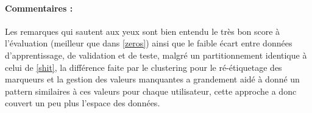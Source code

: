 \begin{table}[H]
	\centering
	\caption{Meilleures architectures sur les données de teste pour l'approche avec Clustering (\ref{clusterApproache}) avec partitionnement one-user-left(\ref{oneLeftLearning})}
\end{table}
\paragraph{Commentaires :	}
Les remarques qui sautent aux yeux sont bien entendu le très bon score à l'évaluation (meilleur que dans \ref{zeros}) ainsi que le faible écart entre données d'apprentissage, de validation et de teste, malgré un partitionnement identique à celui de \ref{shit}, la différence faite par le clustering pour le ré-étiquetage des marqueurs et la gestion des valeurs manquantes a grandement aidé à donné un pattern similaires à ces valeurs pour chaque utilisateur, cette approche a donc couvert un peu plus l'espace des données.